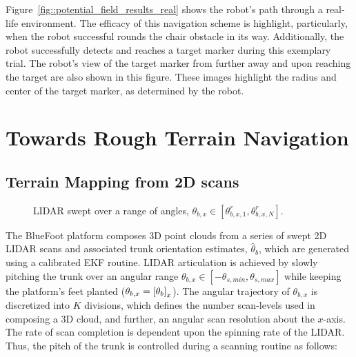 			Figure~\ref{fig::potential_field_results_real} shows the robot's path through a real-life environment. The efficacy of this navigation scheme is highlight, particularly, when the robot successful rounds the chair obstacle in its way. Additionally, the robot successfully detects and reaches a target marker during this exemplary trial. The robot's view of the target marker from further away and upon reaching the target are also shown in this figure. These images highlight the radius and center of the target marker, as determined by the robot.


	\section{Towards Rough Terrain Navigation}


		\subsection{Terrain Mapping from 2D scans}
			\label{ssec::terrain_mapping}
			\begin{figure}[!h]
				\centering
				\caption{LIDAR swept over a range of angles, $\theta_{b,x} \in [\theta_{b,x,1}^{r},\theta_{b,x,N}^{r}]$. }
				\label{fig::sensor_sweep}
			\end{figure}
			The BlueFoot platform composes 3D point clouds from a series of swept 2D LIDAR scans and associated trunk orientation estimates, $\hat{\theta}_{b}$, which are generated using a calibrated EKF routine. LIDAR articulation is achieved by slowly pitching the trunk over an angular range $\theta_{b,x}\in[-\theta_{s,min},\theta_{s,max}]$ while keeping the platform's feet planted ($\theta_{b,x}=\left[\theta_{b}\right]_{x}$). The angular trajectory of $\theta_{b,x}$ is discretized into $K$ divisions, which defines the number scan-levels used in composing a 3D cloud, and further, an angular scan resolution about the $x$-axis. The rate of scan completion is dependent upon the spinning rate of the LIDAR. Thus, the pitch of the trunk is controlled during a scanning routine as follows:
